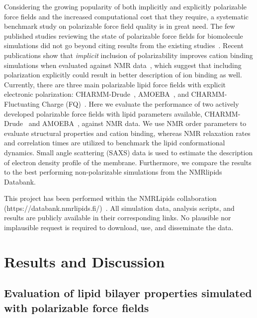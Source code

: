 \documentclass[journal=jacsat,manuscript=article,layout=singlecolumn]{achemso}
\begin{document}
Considering the growing popularity of both implicitly and explicitly polarizable force fields and the increased computational cost that they require, a systematic benchmark study on polarizable force field quality is in great need. The few published studies reviewing the state of polarizable force fields for biomolecule simulations did not go beyond citing results from the existing studies~\cite{inakollu2020polarisable,jing2019polarizable,baker2015polarizable}. Recent publications show that \textit{implicit} inclusion of polarizability improves cation binding simulations when evaluated against NMR data~\cite{Melcr:2018a, melcr2019improved}, which suggest that including polarization explicitly could result in better description of ion binding as well. 
Currently, there are three main polarizable lipid force fields with explicit electronic polarization: CHARMM-Drude~\cite{li2017drude}, AMOEBA~\cite{chu2018anionicpolarizable,chu2018polarizable}, and CHARMM-Fluctuating Charge (FQ)~\cite{lucas2012charge}. 
Here we evaluate the performance of two actively developed polarizable force fields with lipid parameters available, CHARMM-Drude~\cite{li2017drude} and AMOEBA~\cite{chu2018anionicpolarizable,chu2018polarizable}, against NMR data. We use NMR order parameters to evaluate  structural properties and cation binding, whereas NMR relaxation rates and correlation times are utilized to benchmark the lipid conformational dynamics. Small angle scattering (SAXS) data is used to estimate the description of electron density profile of the membrane. Furthermore, we compare the results to the best performing non-polarizable simulations from the NMRlipids Databank\cite{Databank}.


This project has been performed within the NMRLipids collaboration (https://databank.nmrlipids.fi/)~\cite{Databank}. All simulation data, analysis scripts, and results are publicly available in their corresponding links. No plausible nor implausible request is required to download, use, and disseminate the data. 




\section{Results and Discussion}

\subsection{Evaluation of lipid bilayer properties simulated with polarizable force fields}
\end{document}
